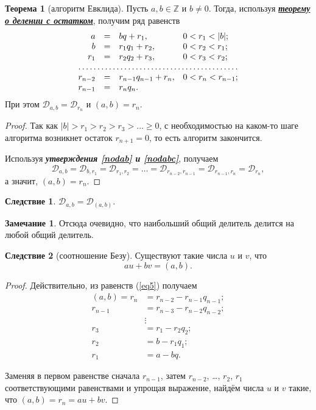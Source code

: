 \documentclass[14pt, a4paper]{extarticle}
\theoremstyle{definition}
\newtheorem{theorem}{Теорема}
\newtheorem*{remark}{Замечание}
\newtheorem{corollary}{Следствие}[theorem]
\begin{document}
	\begin{theorem}[алгоритм Евклида]
		Пусть $a,b\in\mathbb{Z}$ и $b\neq0$. Тогда, используя \hyperref[ost]{\textbf{\textit{теорему о делении с остатком}}}, получим ряд равенств
		\begin{equation}
		\label{eq5}
		\begin{array}{rcll}
			a&=&bq+r_1,&0<r_1<|b|;\\
			b&=&r_1q_1+r_2,&0<r_2<r_1;\\
			r_1&=&r_2q_2+r_3,&0<r_3<r_2;\\
			\hdotsfor{4}\\
			r_{n-2}&=&r_{n-1}q_{n-1}+r_n,&0<r_n<r_{n-1};\\
			r_{n-1}&=&r_nq_n.
		\end{array}
		\end{equation}
		При этом $\mathcal{D}_{a,b}=\mathcal{D}_{r_n}$ и $(a,b)=r_n$.
	\end{theorem}
	\begin{proof}
		Так как $|b|>r_1>r_2>r_3>\dots\geqslant0$, с необходимостью на каком-то шаге алгоритма возникнет остаток $r_{n+1}=0$, то есть алгоритм закончится.
		
		Используя \textbf{\textit{утверждения \ref{nodab} и \ref{nodabc}}}, получаем
		$$\mathcal{D}_{a,b}=\mathcal{D}_{b,r_1}=\mathcal{D}_{r_1,r_2}=\dots=\mathcal{D}_{r_{n-2},r_{n-1}}=\mathcal{D}_{r_{n-1},r_n}=\mathcal{D}_{r_n},$$
		а значит, $(a,b)=r_n$.
	\end{proof}

	\begin{corollary}
	\label{mndel}
		$\mathcal{D}_{a,b}=\mathcal{D}_{(a,b)}$.
	\end{corollary}
	\begin{remark}
		Отсюда очевидно, что наибольший общий делитель делится на любой общий делитель.
	\end{remark}

	\begin{corollary}[соотношение Безу]
	\label{bezu}
		Существуют такие числа $u$ и $v$, что $$\boxed{au+bv=(a,b).}$$
	\end{corollary}
	\begin{proof}
		Действительно, из равенств (\ref{eq5}) получаем
		\begin{align*}
			(a,b)=r_n&=r_{n-2}-r_{n-1}q_{n-1};\\
			r_{n-1}&=r_{n-3}-r_{n-2}q_{n-2};\\
			&\vdots\\
			r_3&=r_1-r_2q_2;\\
			r_2&=b-r_1q_1;\\
			r_1&=a-bq.
		\end{align*}
		
		Заменяя в первом равенстве сначала $r_{n-1}$, затем $r_{n-2}$, \dots, $r_2$, $r_1$ соответствующими равенствами и упрощая выражение, найдём числа $u$ и $v$ такие, что $(a,b)=r_n=au+bv$.
	\end{proof}
\end{document}
